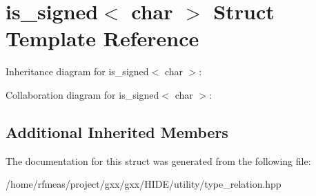 \hypertarget{structis__signed_3_01char_01_4}{}\section{is\+\_\+signed$<$ char $>$ Struct Template Reference}
\label{structis__signed_3_01char_01_4}


Inheritance diagram for is\+\_\+signed$<$ char $>$\+:


Collaboration diagram for is\+\_\+signed$<$ char $>$\+:
\subsection*{Additional Inherited Members}


The documentation for this struct was generated from the following file\+:\begin{DoxyCompactItemize}
\item 
/home/rfmeas/project/gxx/gxx/\+H\+I\+D\+E/utility/type\+\_\+relation.\+hpp\end{DoxyCompactItemize}
